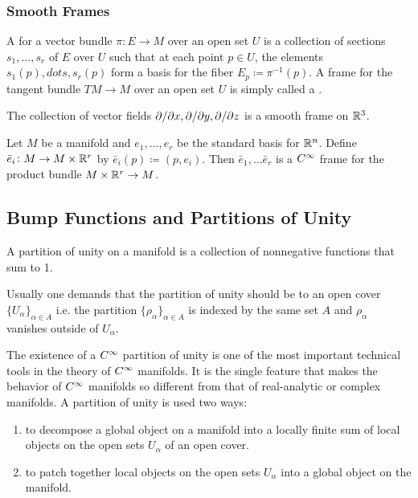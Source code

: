 \subsubsection{Smooth Frames}

A  for a vector bundle \(\pi \colon E \rightarrow M\) over an open set \(U\) is a collection of sections \(s_1, \dots, s_r\) of \(E\) over \(U\) such that at each point \(p \in U\), the elements \(s_1(p), dots, s_r(p)\) form a basis for the fiber \(E_p \coloneqq \pi^{-1}(p)\).
A frame for the tangent bundle \(TM \rightarrow M\) over an open set \(U\) is simply called a .

\begin{example}{}{}
    The collection of vector fields \(\partial  / \partial x, \partial  / \partial y, \partial  / \partial z\) is a smooth frame on \(\mathbb{R}^3\).
\end{example}

\begin{example}{}{}
    Let \(M\) be a manifold and \(e_1, \dots, e_r\) be the standard basis for \(\mathbb{R}^n\).
    Define \(\bar{e}_i \colon M \rightarrow M \times \mathbb{R}^r\) by \(\bar{e}_i (p) \coloneqq (p, e_i)\).
    Then \(\bar{e}_1, \dots \bar{e}_r\) is a \(C^\infty\) frame for the product bundle \(M \times \mathbb{R}^r \rightarrow M\).
\end{example}

\subsection{Bump Functions and Partitions of Unity}

A partition of unity on a manifold is a collection of nonnegative functions that sum
to 1.

Usually one demands that the partition of unity should be  to an open cover \(\{ U_\alpha \}_{\alpha \in A}\) i.e. the partition \(\{\rho_\alpha\}_{\alpha \in A}\) is indexed by the same set \(A\) and \(\rho_\alpha\) vanishes outside of \(U_\alpha\).

The existence of a \(C^\infty\) partition of unity is one of the most important technical tools in the theory of \(C^\infty\) manifolds.
It is the single feature that makes the behavior of \(C^\infty\) manifolds so different from that of real-analytic or complex manifolds.
A partition of unity is used two ways:
\begin{enumerate}
    \item to decompose a global object on a manifold into a locally finite sum of local objects on the open sets \(U_\alpha\) of an open cover. 
    \item to patch together local objects on the open sets \(U_\alpha\) into a global object on the manifold.
\end{enumerate}

